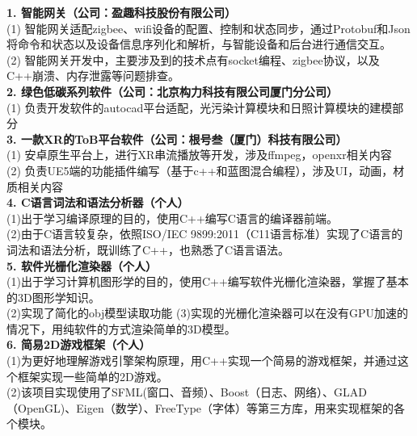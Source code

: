 \documentclass{resume} %
\begin{document}
\begin{rSection}{}
\textbf{1.	智能网关（公司：盈趣科技股份有限公司）}\\
(1) 智能网关适配zigbee、wifi设备的配置、控制和状态同步，通过Protobuf和Json将命令和状态以及设备信息序列化和解析，与智能设备和后台进行通信交互。 \\
(2) 智能网关开发中，主要涉及到的技术点有socket编程、zigbee协议，以及C++崩溃、内存泄露等问题排查。 \\
\textbf{2. 绿色低碳系列软件（公司：北京构力科技有限公司厦门分公司）}\\
(1) 负责开发软件的autocad平台适配，光污染计算模块和日照计算模块的建模部分\\
\textbf{3. 一款XR的ToB平台软件（公司：根号叁（厦门）科技有限公司）}\\ 
(1) 安卓原生平台上，进行XR串流播放等开发，涉及ffmpeg，openxr相关内容 \\
(2) 负责UE5端的功能插件编写（基于c++和蓝图混合编程），涉及UI，动画，材质相关内容 \\
\textbf{4.  C语言词法和语法分析器（个人）}\\
(1)出于学习编译原理的目的，使用C++编写C语言的编译器前端。\\
(2)由于C语言较复杂，依照ISO/IEC 9899:2011（C11语言标准）实现了C语言的词法和语法分析，既训练了C++，也熟悉了C语言语法。 \\
\textbf{5.  软件光栅化渲染器（个人）}\\
(1)出于学习计算机图形学的目的，使用C++编写软件光栅化渲染器，掌握了基本的3D图形学知识。\\
(2)实现了简化的obj模型读取功能
(3)实现的光栅化渲染器可以在没有GPU加速的情况下，用纯软件的方式渲染简单的3D模型。\\
\textbf{6.	简易2D游戏框架（个人）}\\
(1)为更好地理解游戏引擎架构原理，用C++实现一个简易的游戏框架，并通过这个框架实现一些简单的2D游戏。 \\
(2)该项目实现使用了SFML(窗口、音频）、Boost（日志、网络）、GLAD（OpenGL)、Eigen（数学）、FreeType（字体）等第三方库，用来实现框架的各个模块。\\



\end{rSection}

\end{document}
